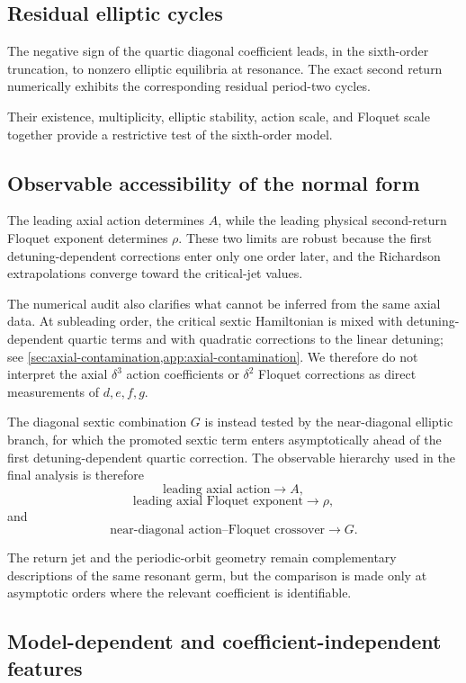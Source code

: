\subsection{Residual elliptic cycles}

The negative sign of the quartic diagonal coefficient leads, in the sixth-order truncation, to nonzero elliptic equilibria at resonance. The exact second return numerically exhibits the corresponding residual period-two cycles.

Their existence, multiplicity, elliptic stability, action scale, and Floquet scale together provide a restrictive test of the sixth-order model.

\subsection{Observable accessibility of the normal form}

The leading axial action determines \(A\), while the leading physical second-return Floquet exponent determines \(\rho\).  These two limits are robust because the first detuning-dependent corrections enter only one order later, and the Richardson extrapolations converge toward the critical-jet values.

The numerical audit also clarifies what cannot be inferred from the same axial data.  At subleading order, the critical sextic Hamiltonian is mixed with detuning-dependent quartic terms and with quadratic corrections to the linear detuning; see \cref{sec:axial-contamination,app:axial-contamination}.  We therefore do not interpret the axial \(\delta^3\) action coefficients or \(\delta^2\) Floquet corrections as direct measurements of \(d,e,f,g\).

The diagonal sextic combination \(G\) is instead tested by the near-diagonal elliptic branch, for which the promoted sextic term enters asymptotically ahead of the first detuning-dependent quartic correction.  The observable hierarchy used in the final analysis is therefore
\[
\text{leading axial action}\longrightarrow A,
\]
\[
\text{leading axial Floquet exponent}\longrightarrow\rho,
\]
and
\[
\text{near-diagonal action--Floquet crossover}\longrightarrow G.
\]

The return jet and the periodic-orbit geometry remain complementary descriptions of the same resonant germ, but the comparison is made only at asymptotic orders where the relevant coefficient is identifiable.

\subsection{Model-dependent and coefficient-independent features}

